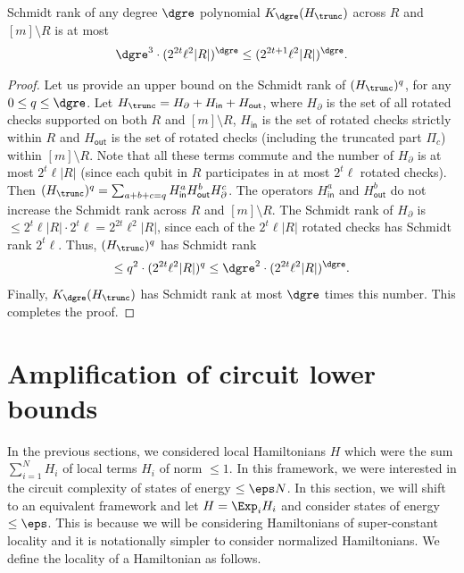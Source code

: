 \documentclass{toc}
\begin{document}
\begin{claim}
\label{clm:schmidtrank}
Schmidt rank of any degree $\dgre$ polynomial $K_{\dgre}(H_{\trunc})$ across $R$ and $[m]\setminus R$ is at most 
\begin{align}\dgre^3\cdot (2^{2t}\ell^2|R|)^{\dgre}\leq (2^{2t+1}\ell^2|R|)^{\dgre}.
\end{align}
\end{claim}
\begin{proof}
Let us provide an upper bound on the Schmidt rank of $(H_{\trunc})^q$, for any $0\leq q \leq \dgre$. Let $H_{\trunc}= H_{\partial} + H_{\mathsf{in}} + H_{\mathsf{out}}$, where $H_{\partial}$ is the set of all rotated checks supported on both $R$ and $[m]\setminus R$, $H_{\mathsf{in}}$ is the set of rotated checks strictly within $R$ and $H_{\mathsf{out}}$ is the set of rotated checks (including the truncated part $\Pi_c$) within $[m]\setminus R$. Note that all these terms commute and the number of $H_{\partial}$ is at most $2^t\ell|R|$ (since each qubit in $R$ participates in at most $2^t\ell$ rotated checks). Then $(H_{\trunc})^q= \sum_{a+b+c=q}H_{\mathsf{in}}^a H_{\mathsf{out}}^b H_{\partial}^c$. The operators $H_{\mathsf{in}}^a$ and $H_{\mathsf{out}}^b$ do not increase the Schmidt rank across $R$ and $[m]\setminus R$. The Schmidt rank of $H_{\partial}$ is $\leq 2^t\ell|R|\cdot 2^t\ell = 2^{2t}\ell^2|R|$, since each of the $2^t\ell|R|$ rotated checks has Schmidt rank $2^t\ell$. Thus, $(H_{\trunc})^q$ has Schmidt rank 
\begin{align}\leq q^2\cdot (2^{2t}\ell^2|R|)^q\leq \dgre^2\cdot (2^{2t}\ell^2|R|)^{\dgre}.\end{align} Finally, $K_{\dgre}(H_{\trunc})$ has Schmidt rank at most $\dgre$ times this number. This completes the proof.
\end{proof}

\section{Amplification of circuit lower bounds}

\label{sec:amplification}



In the previous sections, we considered local Hamiltonians $H$ which were the sum $\sum_{i = 1}^N H_i$ of local terms $H_i$ of norm $\leq 1$. In this framework, we were interested in the circuit complexity of states of energy $\leq \eps N$. In this section, we will shift to an equivalent framework and let $H = \Exp_i H_i$ and consider states of energy $\leq \eps$. 
This is because we will be considering Hamiltonians of super-constant locality and it is notationally simpler to consider normalized Hamiltonians.
We define the locality of a Hamiltonian as follows.
\end{document}
